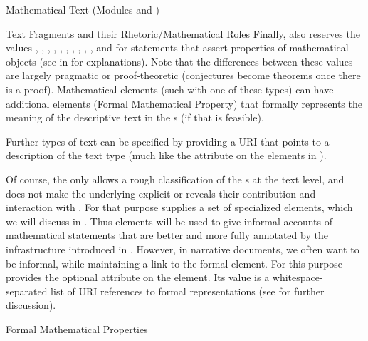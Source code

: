 \begin{tchapter}[id=mtxt,short=Mathematical Text]{Mathematical Text (Modules
   and )}
\begin{tsection}[id=omtext]{Text Fragments and their Rhetoric/Mathematical Roles}
Finally, \omdoc also reserves the values ,
, ,
, ,
, ,
, ,
,  and
 for statements that assert properties of mathematical
objects (see  in  for
explanations). Note that the differences between these values are largely pragmatic or
proof-theoretic (conjectures become theorems once there is a proof).  Mathematical
 elements (such with one of these types) can have additional
 elements (Formal Mathematical Property) that formally represents the
meaning of the descriptive text in the s (if that is feasible).

Further types of text can be specified by providing a URI that points to a description of
the text type (much like the  attribute on
the  elements in {\cmathml}).

Of course, the  only allows a rough classification of the
s at the text level, and does not make the underlying
 explicit or reveals their contribution and interaction with
.  For that purpose \omdoc supplies a set of
specialized elements, which we will discuss in .  Thus
 elements will be used to give informal accounts of mathematical
statements that are better and more fully annotated by the infrastructure introduced in
. However, in narrative documents, we often want to be informal,
while maintaining a link to the formal element. For this purpose \omdoc provides the
optional  attribute on the  element. Its
value is a whitespace-separated list of URI references to formal representations (see
 for further discussion).
\end{tsection}

\begin{tsection}[id=FMP]{Formal Mathematical Properties}
  

\end{tsection}
\end{tchapter}

